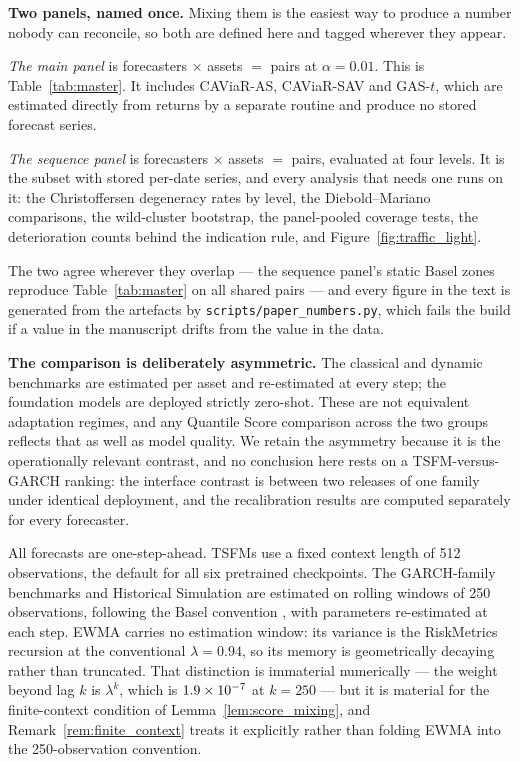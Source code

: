 \documentclass[preprint,11pt,authoryear]{elsarticle}
\newcommand{\1}{\boldsymbol{1}}
\begin{document}
\textbf{Two panels, named once.} Mixing them is the easiest way to produce a
number nobody can reconcile, so both are defined here and tagged wherever they
appear.

\emph{The main panel} is \nMainForecasters{} forecasters $\times$ \nMainAssets{}
assets $=$ \nMainPairs{} pairs at $\alpha = 0.01$. This is Table~\ref{tab:master}.
It includes CAViaR-AS, CAViaR-SAV and GAS-$t$, which are estimated directly from
returns by a separate routine and produce no stored forecast series.

\emph{The sequence panel} is \nSeqForecasters{} forecasters $\times$
\nMainAssets{} assets $=$ \nSeqPairs{} pairs, evaluated at four levels. It is the
subset with stored per-date series, and every analysis that needs one runs on it:
the Christoffersen degeneracy rates by level, the Diebold--Mariano comparisons,
the wild-cluster bootstrap, the panel-pooled coverage tests, the deterioration
counts behind the indication rule, and Figure~\ref{fig:traffic_light}.

The two agree wherever they overlap --- the sequence panel's static Basel zones
reproduce Table~\ref{tab:master} on all \nSeqPairs{} shared pairs --- and every
figure in the text is generated from the artefacts by
\texttt{scripts/paper\_numbers.py}, which fails the build if a value in the
manuscript drifts from the value in the data.

\textbf{The comparison is deliberately asymmetric.} The classical and dynamic
benchmarks are estimated per asset and re-estimated at every step; the foundation
models are deployed strictly zero-shot. These are not equivalent adaptation
regimes, and any Quantile Score comparison across the two groups reflects that
as well as model quality. We retain the asymmetry because it is the
operationally relevant contrast, and no conclusion here rests on a
TSFM-versus-GARCH ranking: the interface contrast is between two releases of one
family under identical deployment, and the recalibration results are computed
separately for every forecaster.

All forecasts are one-step-ahead. TSFMs use a fixed context length of 512 observations, the default for all six pretrained checkpoints. The GARCH-family benchmarks and Historical Simulation are estimated on rolling windows of 250 observations, following the Basel convention \citep{basel1996}, with parameters re-estimated at each step. EWMA carries no estimation window: its variance is the RiskMetrics recursion at the conventional $\lambda = 0.94$, so its memory is geometrically decaying rather than truncated. That distinction is immaterial numerically --- the weight beyond lag $k$ is $\lambda^k$, which is $1.9\times 10^{-7}$ at $k = 250$ --- but it is material for the finite-context condition of Lemma~\ref{lem:score_mixing}, and Remark~\ref{rem:finite_context} treats it explicitly rather than folding EWMA into the 250-observation convention.
\end{document}
